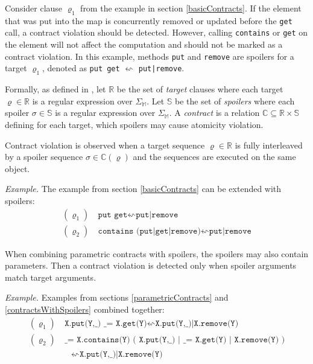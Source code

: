 Consider clause $\varrho_1$ from the example in section \ref{basicContracts}. If
the element that was put into the map is concurrently removed or updated before
the \texttt{get} call, a contract violation should be detected.  However,
calling \texttt{contains} or \texttt{get} on the element will not affect the
computation and should not be marked as a contract violation. In this example,
methods \texttt{put} and \texttt{remove} are spoilers for a target
$\varrho_1$, denoted as \texttt{put get} $\leftsquigarrow$ \texttt{put|remove}.


Formally, as defined in \cite{contracts}, let $\mathbb{R}$ be the set of
\emph{target} clauses where each target $\varrho \in \mathbb{R}$ is a regular
expression over $\Sigma_\mathbb{M}$. Let $\mathbb{S}$ be the set of
\emph{spoilers} where each spoiler $\sigma \in \mathbb{S}$ is a regular
expression over $\Sigma_\mathbb{M}$. A \emph{contract} is a relation $\mathbb{C}
\subseteq \mathbb{R} \times \mathbb{S}$ defining for each target, which spoilers
may cause atomicity violation.

Contract violation is observed when a target sequence $\varrho \in \mathbb{R}$
is fully interleaved by a spoiler sequence $\sigma \in \mathbb{C}(\varrho)$ and
the sequences are executed on the same object.

\emph{Example.} The example from section \ref{basicContracts} can be extended
with spoilers:
\begin{align*}
    (\varrho_1) &\ \texttt{put get} \leftsquigarrow \texttt{put|remove}\\
    (\varrho_2) &\ \texttt{contains (put|get|remove)} \leftsquigarrow
    \texttt{put|remove}
\end{align*}

When combining parametric contracts with spoilers, the spoilers may also contain
parameters. Then a contract violation is detected only when spoiler arguments
match target arguments.

\emph{Example.} Examples from sections \ref{parametricContracts} and
\ref{contractsWithSpoilers} combined together:
\begin{align*}
    (\varrho_1) &\ \texttt{X.put(Y,\_) \_ = X.get(Y)} \leftsquigarrow
    \texttt{X.put(Y,\_)|X.remove(Y)}\\
    (\varrho_2) &\ \texttt{\_ = X.contains(Y) ( X.put(Y,\_) | \_ = X.get(Y) |
    X.remove(Y) )}\\
    &\quad \leftsquigarrow \texttt{X.put(Y,\_)|X.remove(Y)}
\end{align*}


